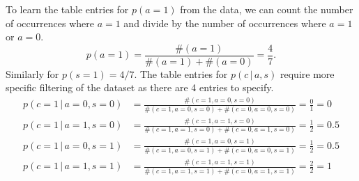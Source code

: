 \documentclass{article}
\newcommand{\giv}{\,|\,}
\begin{document}
\noindent To learn the table entries for $p(a = 1)$ from the data, we can count the number of occurrences where $a = 1$ and divide by the number of occurrences where $a = 1$ or $a = 0$. 
$$
    p(a = 1) = \frac{\#(a = 1)}{\#(a = 1) + \#(a = 0)} = \frac{4}{7}.
$$
Similarly for $p(s=1) = 4/7$. The table entries for $p(c \giv a, s)$ require more specific filtering of the dataset as there are 4 entries to specify. 
\begin{align*}
    p(c = 1 \giv a = 0, s = 0) &= \frac{\#(c = 1, a = 0, s = 0)}{\#(c = 1, a = 0, s = 0) + \#(c = 0, a = 0, s = 0)} = \frac{0}{1} = 0 \\[1em]
    p(c = 1 \giv a = 1, s = 0) &= \frac{\#(c = 1, a = 1, s = 0)}{\#(c = 1, a = 1, s = 0) + \#(c = 0, a = 1, s = 0)} = \frac{1}{2} = 0.5 \\[1em]
    p(c = 1 \giv a = 0, s = 1) &= \frac{\#(c = 1, a = 0, s = 1)}{\#(c = 1, a = 0, s = 1) + \#(c = 0, a = 0, s = 1)} = \frac{1}{2} = 0.5 \\[1em]
    p(c = 1 \giv a = 1, s = 1) &= \frac{\#(c = 1, a = 1, s = 1)}{\#(c = 1, a = 1, s = 1) + \#(c = 0, a = 1, s = 1)} = \frac{2}{2} = 1 
\end{align*}
\end{document}
